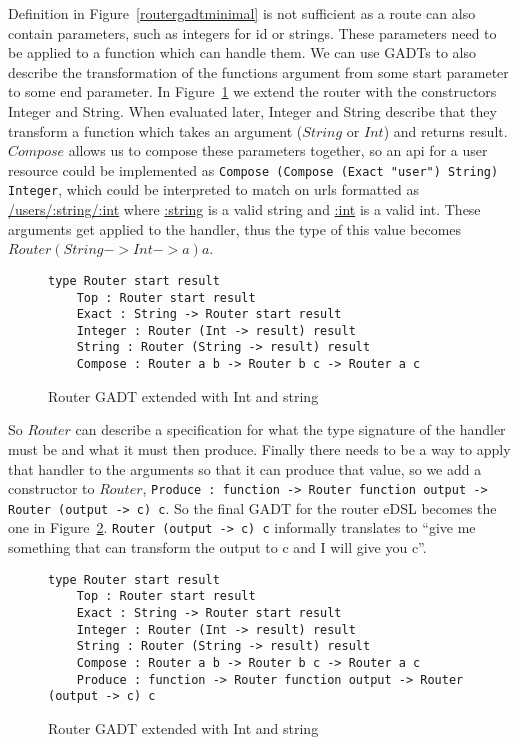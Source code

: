 Definition in Figure~\ref{routergadtminimal} is not sufficient as a route can
also contain parameters, such as integers for id or strings.  These parameters
need to be applied to a function which can handle them. We can use GADTs to also
describe the transformation of the functions argument from some start parameter
to some end parameter. In Figure~\ref{extendedrouter} we extend the router with the
constructors Integer and String. When evaluated later, Integer and String
describe that they transform a function which takes an argument ($String$ or
$Int$) and returns result. $Compose$ allows us to compose these parameters
together, so an api for a user resource could be implemented as \texttt{Compose
(Compose (Exact "user") String) Integer}, which could be interpreted to match on
urls formatted as \url{/users/:string/:int} where \url{:string} is a valid
string and \url{:int} is a valid int. These arguments get applied to the
handler, thus the type of this value becomes $Router (String -> Int -> a) a$.

\begin{figure}[H]
    \begin{lstlisting}
type Router start result 
    Top : Router start result
    Exact : String -> Router start result
    Integer : Router (Int -> result) result
    String : Router (String -> result) result
    Compose : Router a b -> Router b c -> Router a c
    \end{lstlisting}
    \caption{Router GADT extended with Int and string}
    \label{extendedrouter}
\end{figure}

So $Router$ can describe a specification for what the type signature of the
handler must be and what it must then produce. Finally there needs to be a way
to apply that handler to the arguments so that it can produce that value, so we
add a constructor to $Router$, \texttt{Produce : function -> Router function
output -> Router (output -> c) c}. So the final GADT for the router eDSL becomes
the one in Figure~\ref{finalrouter}. \texttt{Router (output -> c) c} informally
translates to ``give me something that can transform the output to c and I will
give you c''.

\begin{figure}[H]
    \begin{lstlisting}
type Router start result 
    Top : Router start result
    Exact : String -> Router start result
    Integer : Router (Int -> result) result
    String : Router (String -> result) result
    Compose : Router a b -> Router b c -> Router a c
    Produce : function -> Router function output -> Router (output -> c) c
    \end{lstlisting}
    \caption{Router GADT extended with Int and string}
    \label{finalrouter}
\end{figure}

